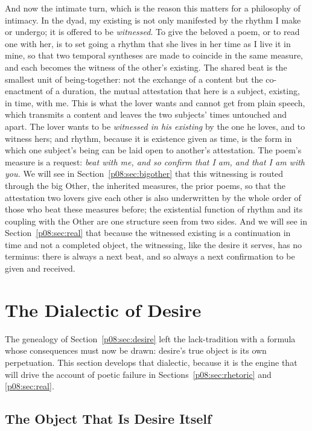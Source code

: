 And now the intimate turn, which is the reason this matters for a philosophy of intimacy. In the dyad, my existing is not only manifested by the rhythm I make or undergo; it is offered to be \emph{witnessed}. To give the beloved a poem, or to read one with her, is to set going a rhythm that she lives in her time as I live it in mine, so that two temporal syntheses are made to coincide in the same measure, and each becomes the witness of the other's existing. The shared beat is the smallest unit of being-together: not the exchange of a content but the co-enactment of a duration, the mutual attestation that here is a subject, existing, in time, with me. This is what the lover wants and cannot get from plain speech, which transmits a content and leaves the two subjects' times untouched and apart. The lover wants to be \emph{witnessed in his existing} by the one he loves, and to witness hers; and rhythm, because it is existence given as time, is the form in which one subject's being can be laid open to another's attestation. The poem's measure is a request: \emph{beat with me, and so confirm that I am, and that I am with you.} We will see in Section~\ref{p08:sec:bigother} that this witnessing is routed through the big Other, the inherited measures, the prior poems, so that the attestation two lovers give each other is also underwritten by the whole order of those who beat these measures before; the existential function of rhythm and its coupling with the Other are one structure seen from two sides. And we will see in Section~\ref{p08:sec:real} that because the witnessed existing is a continuation in time and not a completed object, the witnessing, like the desire it serves, has no terminus: there is always a next beat, and so always a next confirmation to be given and received.

\section{The Dialectic of Desire}\label{p08:sec:dialectic}

The genealogy of Section~\ref{p08:sec:desire} left the lack-tradition with a formula whose consequences must now be drawn: desire's true object is its own perpetuation. This section develops that dialectic, because it is the engine that will drive the account of poetic failure in Sections~\ref{p08:sec:rhetoric} and \ref{p08:sec:real}.

\subsection{The Object That Is Desire Itself}

